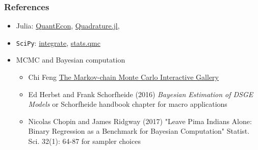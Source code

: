 \documentclass[bigger,handout]{beamer}
\begin{document}
\begin{frame}%

\frametitle{References}

\begin{itemize}

\item Julia: \href{https://julia.quantecon.org/more_julia/general_packages.html}{QuantEcon}, \href{https://github.com/SciML/Quadrature.jl}{Quadrature.jl}, 
\item \texttt{SciPy}: \href{https://docs.scipy.org/doc/scipy/reference/integrate.html}{integrate}, \href{https://docs.scipy.org/doc/scipy/reference/stats.qmc.html}{stats.qmc}

\item MCMC and Bayesian computation
\begin{itemize}
\item Chi Feng \href{https://chi-feng.github.io/mcmc-demo/}{The Markov-chain Monte Carlo Interactive Gallery}
\item Ed Herbst and Frank Schorfheide (2016) \emph{Bayesian Estimation of DSGE Models} or Schorfheide handbook chapter for macro applications
\item Nicolas Chopin and James Ridgway (2017) "Leave Pima Indians Alone: Binary Regression as a Benchmark for Bayesian Computation"  Statist. Sci. 32(1): 64-87 for sampler choices
\end{itemize}

\end{itemize}


\end{frame}%
\end{document}

